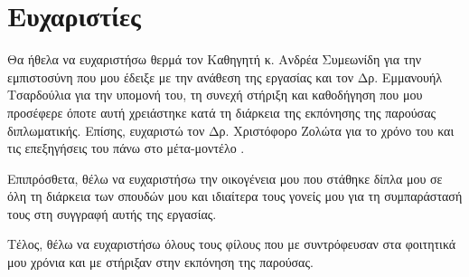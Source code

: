 \section*{Ευχαριστίες}
{}

Θα ήθελα να ευχαριστήσω θερμά τον Kαθηγητή κ. Ανδρέα Συμεωνίδη για την εμπιστοσύνη που μου έδειξε με την ανάθεση της εργασίας
και τον Δρ. Εμμανουήλ Τσαρδούλια για την υπομονή του, τη συνεχή στήριξη και καθοδήγηση που μου προσέφερε όποτε αυτή χρειάστηκε κατά τη διάρκεια της εκπόνησης της παρούσας διπλωματικής.
Επίσης, ευχαριστώ τον Δρ. Χριστόφορο Ζολώτα για το χρόνο του και τις επεξηγήσεις του πάνω στο μέτα-μοντέλο \metamodel{}.

Επιπρόσθετα, θέλω να ευχαριστήσω την οικογένεια μου που στάθηκε δίπλα μου σε όλη τη διάρκεια των σπουδών μου και ιδιαίτερα τους γονείς μου για τη συμπαράστασή τους στη συγγραφή αυτής της εργασίας.

Τέλος, θέλω να ευχαριστήσω όλους τους φίλους που με συντρόφευσαν στα φοιτητικά μου χρόνια και με στήριξαν στην εκπόνηση της παρούσας.

